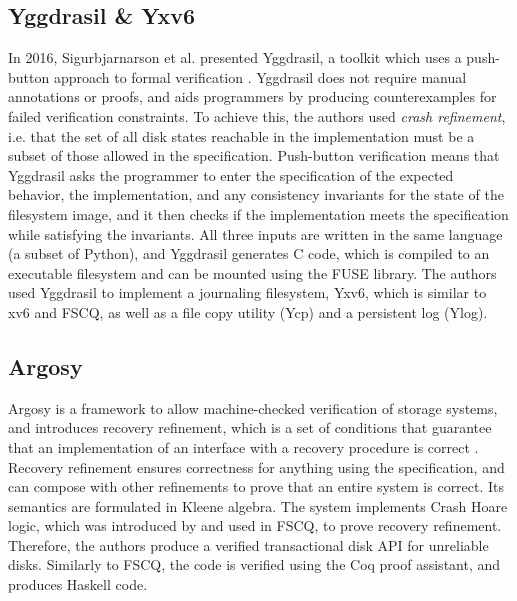 \subsection{Yggdrasil \& Yxv6}
In 2016, Sigurbjarnarson et al. presented Yggdrasil, a toolkit which uses a push-button approach to formal verification \cite{sigurbjarnarson2016}.
Yggdrasil does not require manual annotations or proofs, and aids programmers by producing counterexamples for failed verification constraints.
To achieve this, the authors used \textit{crash refinement}, i.e. that the set of all disk states reachable in the implementation must be a subset of those allowed in the specification.
Push-button verification means that Yggdrasil asks the programmer to enter the specification of the expected behavior, the implementation, and any consistency invariants for the state of the filesystem image, and it then checks if the implementation meets the specification while satisfying the invariants.
All three inputs are written in the same language (a subset of Python), and Yggdrasil generates C code, which is compiled to an executable filesystem and can be mounted using the FUSE library.
The authors used Yggdrasil to implement a journaling filesystem, Yxv6, which is similar to xv6 and FSCQ, as well as a file copy utility (Ycp) and a persistent log (Ylog).

\subsection{Argosy}
Argosy is a framework to allow machine-checked verification of storage systems, and introduces recovery refinement, which is a set of conditions that guarantee that an implementation of an interface with a recovery procedure is correct \cite{chajed2019}.
Recovery refinement ensures correctness for anything using the specification, and can compose with other refinements to prove that an entire system is correct.
Its semantics are formulated in Kleene algebra.
The system implements Crash Hoare logic, which was introduced by and used in FSCQ, to prove recovery refinement.
Therefore, the authors produce a verified transactional disk API for unreliable disks.
Similarly to FSCQ, the code is verified using the Coq proof assistant, and produces Haskell code.

